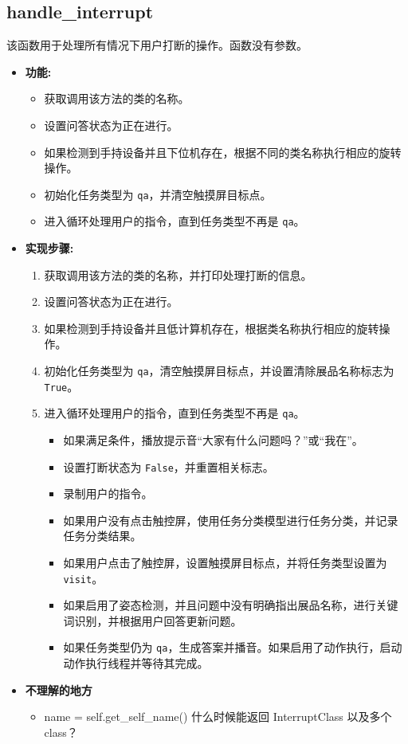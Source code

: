 \documentclass[]{article}
\begin{document}
\subsection{handle\_interrupt}
该函数用于处理所有情况下用户打断的操作。函数没有参数。

\begin{itemize}
	\item \textbf{功能:}
	\begin{itemize}
		\item 获取调用该方法的类的名称。
		\item 设置问答状态为正在进行。
		\item 如果检测到手持设备并且下位机存在，根据不同的类名称执行相应的旋转操作。
		\item 初始化任务类型为 \texttt{qa}，并清空触摸屏目标点。
		\item 进入循环处理用户的指令，直到任务类型不再是 \texttt{qa}。
	\end{itemize}
	\item \textbf{实现步骤:}
	\begin{enumerate}
		\item 获取调用该方法的类的名称，并打印处理打断的信息。
		\item 设置问答状态为正在进行。
		\item 如果检测到手持设备并且低计算机存在，根据类名称执行相应的旋转操作。
		\item 初始化任务类型为 \texttt{qa}，清空触摸屏目标点，并设置清除展品名称标志为 \texttt{True}。
		\item 进入循环处理用户的指令，直到任务类型不再是 \texttt{qa}。
		\begin{itemize}
			\item 如果满足条件，播放提示音“大家有什么问题吗？”或“我在”。
			\item 设置打断状态为 \texttt{False}，并重置相关标志。
			\item 录制用户的指令。
			\item 如果用户没有点击触控屏，使用任务分类模型进行任务分类，并记录任务分类结果。
			\item 如果用户点击了触控屏，设置触摸屏目标点，并将任务类型设置为 \texttt{visit}。
			\item 如果启用了姿态检测，并且问题中没有明确指出展品名称，进行关键词识别，并根据用户回答更新问题。
			\item 如果任务类型仍为 \texttt{qa}，生成答案并播音。如果启用了动作执行，启动动作执行线程并等待其完成。
		\end{itemize}
	\end{enumerate}
	\item \textbf{{不理解的地方}}
\begin{itemize}
	\item name = self.get\_self\_name() 什么时候能返回 InterruptClass 以及多个 class？\\
	

\end{itemize}
\end{itemize}
\end{document}
